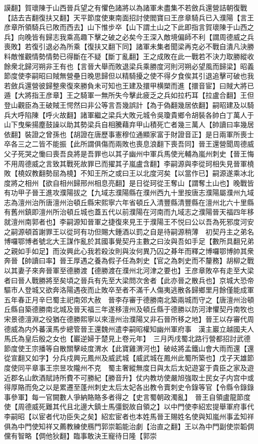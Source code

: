 謨翻】賀瓌陳于山西晉兵望之有懼色諸將以為諸軍未盡集不若斂兵還營詰朝復戰【詰去吉翻復扶又翻】天平節度使東南面招討使閻寶曰王彦章騎兵已入濮陽【言王彦章所領騎兵已敗而西去】山下惟步卒【山下謂土山之下此即指言賀瓌陳于山西之兵】向晚皆有歸志我乘高趣下擊之破之必矣今王深入敵境偏師不利【謂周德威之兵喪敗】若復引退必為所乘【復扶又翻下同】諸軍未集者聞梁再克必不戰自潰凡決勝料敵惟觀情勢情勢已得斷在不疑【斷丁亂翻】王之成敗在此一戰若不決力取勝縱收餘衆北歸河朔非王有也【言晉大舉而敗退梁兵乘勝度河則河朔必望風而歸梁】昭義節度使李嗣昭曰賊無營壘日晚思歸但以精騎擾之使不得夕食俟其引退追擊可破也我若斂兵還營彼歸整衆復來勝負未可知也王建及擐甲横槊而進【擐音宦】曰賊大將已遁【大將指王彦章】王之騎軍一無所失今擊此疲乏之兵如拉朽耳【拉盧合翻】王但登山觀臣為王破賊王愕然曰非公等言吾幾誤計【為于偽翻幾居依翻】嗣昭建及以騎兵大呼陷陳【呼火故翻】諸軍繼之梁兵大敗元城令吳瓊貴鄉令胡裝各帥白丁萬人于山下曳柴揚塵鼓譟以助其勢梁兵自相騰藉弃甲山積死亡者幾三萬人【帥讀曰率幾居依翻】裝證之曾孫也【胡證在唐歷事憲穆位通顯家富于財證音正】是日兩軍所喪士卒各三之二皆不能振【此所謂俱傷而兩敗也喪息浪翻下喪吾同】晉王還營聞周德威父子死哭之慟曰喪吾良將是吾罪也以其子幽州中軍兵馬使光輔為嵐州刺史【晉王悔不用周德威之言致其戰死故罪已而擢其子嵐盧含翻】李嗣源與李從珂相失見晉軍橈敗【橈奴教翻勢屈為橈】不知王所之或曰王以北度河矣【以當作已】嗣源遂乘冰北度將之相州【欲自相州歸邢州相息亮翻】是日從珂從王奪山【謂奪土山也】晚戰皆有功甲子晉王進攻濮陽拔之【九域志濮陽縣在濮州西九十里按唐志濮陽屬濮州九域志為澶州治所唐澶州治頓丘縣宋熙寧六年省頓丘入清豐縣清豐縣在澶州北六十里縣有舊州鎮即澶州所治頓丘城也蓋五代以前濮陽在河南而九域志之濮陽晉天福四年移就澶州南郭者也】李嗣源知晉軍之捷復來見王于濮陽王不悦曰公以吾為死邪度河安之嗣源頓首謝罪王以從珂有功但賜大鍾酒以罰之自是待嗣源稍薄　初契丹主之弟名博囉鄂博者號北大王謀作亂於其國事覺契丹主數之曰汝與吾如手足【數所具翻兄弟之親如手如足】而汝興此心我若殺汝則與汝何異乃囚之朞年而釋之博囉鄂博帥其衆奔晉【帥讀曰率】晉王厚遇之養為假子任為刺史【官之為刺史而不釐務】胡柳之戰以其妻子來奔晉軍至德勝渡【德勝渡在濮州北河津之要也】王彦章敗卒有走至大梁者曰晉人戰勝將至矣頃之晉兵有先至大梁問次舍者【此亦晉之散兵也】京城大恐帝驅市人登城又欲奔洛陽遇夜而止敗卒至者不滿千人傷夷逃散各歸鄉里月餘僅能成軍五年春正月辛巳蜀主祀南郊大赦　晉李存審于德勝南北築兩城而守之【唐澶州治頓丘縣自築德勝南北城及晉天福三年遂移澶州及頓丘縣于德勝以防河津懼契丹南牧也宋景德澶淵之役猶在德勝熙寧以來澶州治濮陽又非石晉所移之地】晉王以存審代周德威為内外蕃漢馬步總管晉王還魏州遣李嗣昭權知幽州軍府事　漢主巖立越國夫人馬氏為皇后殷之女也【巖逆婦于楚見上卷元年】　三月丙戌蜀北路行營都招討武德節度使王宗播等自散關擊岐度渭水【此寶雞渭河也】破岐將孟鐵山會大雨而還【還從宣翻又如字】分兵戍興元鳳州及威武城【威武城在鳳州此蜀所築也】戊子天雄節度使同平章事王宗昱攻隴州不克　蜀主奢縱無度日與太后太妃遊宴于貴臣之家及遊近郡名山飲酒賦詩所費不可勝紀【勝音升】仗内教坊使嚴旭強取士民女子内宫中或得厚賂而免之以是累遷至蓬州刺史太后太妃各出教令賣刺史令錄等官【令縣令錄錄事參軍】每一官闕數人爭納賂賂多者得之【史言蜀朝政濁亂】　晉王自領盧龍節度使【周德威死難其代且北邊大鎮士馬彊鋭故自領之】以中門使李紹宏提舉軍府事代李嗣昭【以宦者代功臣失之矣】紹宏宦者也本姓馬晉王賜姓名使與知嵐州事孟知祥俱為中門使知祥又薦教練使鴈門郭崇韜能治劇【治直之翻】王以為中門副使崇韜倜儻有智略【倜他狄翻】臨事敢決王寵待日隆【郭崇